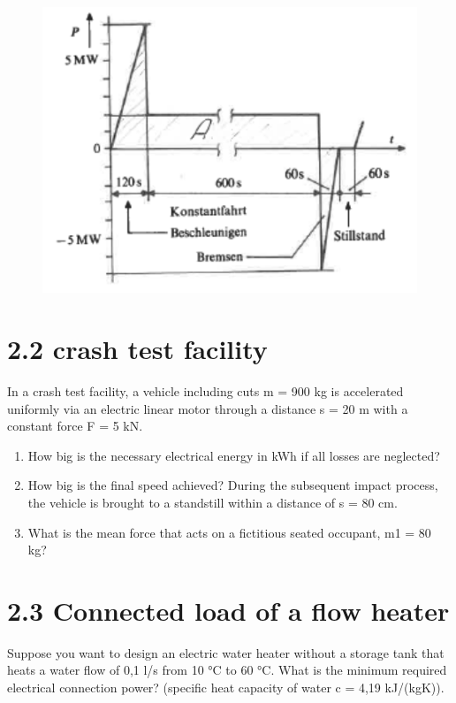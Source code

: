 \documentclass[10pt,ngerman]{scrartcl}
\begin{document}
\begin{figure}[H]
	\centering
	\includegraphics[scale=0.5]{group_work_1.png}
\end{figure}

\section{2.2 crash test facility}
In a crash test facility, a vehicle including cuts m = 900 kg is accelerated uniformly via an electric linear motor through a distance s = 20 m with a constant force F = 5 kN.
\begin{enumerate}
	\item How big is the necessary electrical energy in kWh if all losses are neglected?
	\item How big is the final speed achieved? During the subsequent impact process, the vehicle is brought to a standstill within a distance of s = 80 cm.
	\item What is the mean force that acts on a fictitious seated occupant, m1 = 80 kg?
\end{enumerate}

\section{2.3 Connected load of a flow heater}
Suppose you want to design an electric water heater without a storage tank that heats a water flow of 0,1 l/s from 10 °C to 60 °C. What is the minimum required electrical connection power? (specific heat capacity of water c = 4,19 kJ/(kgK)).
\end{document}
